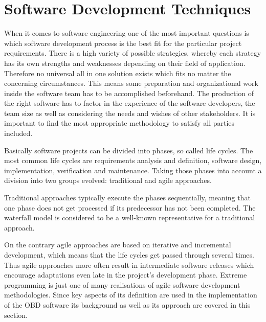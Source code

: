 
\chapter{Software Development Techniques}
\label{sec:SDT}

When it comes to software engineering one of the most important questions is which software development process 
is the best fit for the particular project requirements. There is a high variety of possible strategies, whereby 
each strategy has its own strengths and weaknesses depending on their field of application. Therefore no universal 
all in one solution exists which fits no matter the concerning circumstances. This means some preparation and 
organizational work inside the software team has to be accomplished beforehand. The production of the right software 
has to factor in the experience of the software developers, the team size as well as considering the needs and wishes 
of other stakeholders. It is important to find the most appropriate methodology to satisfy all parties included.

Basically software projects can be divided into phases, so called life cycles. The most common life cycles are 
requirements analysis and definition, software design, implementation, verification and maintenance. Taking those 
phases into account a division into two groups evolved: traditional and agile approaches.

Traditional approaches typically execute the phases sequentially, meaning that one phase does not get processed if 
its predecessor has not been completed. The waterfall model is considered to be a well-known representative for a traditional approach.


On the contrary agile approaches are based on iterative and incremental development, which means that the life cycles 
get passed through several times. Thus agile approaches more often result in intermediate software releases which 
encourage adaptations even late in the project’s development phase. Extreme programming is just one of many realisations 
of agile software development methodologies. Since key aspects of its definition are used in the implementation of the OBD 
software its background as well as its approach are covered in this section. 

